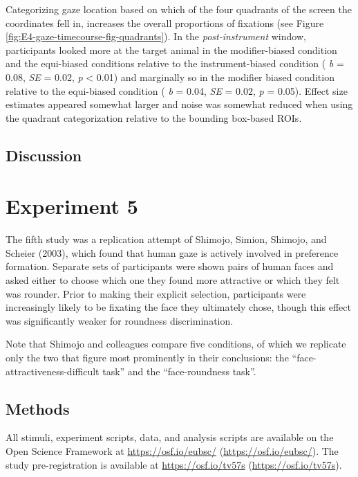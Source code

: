 \documentclass[
  man,floatsintext]{apa6}
\begin{document}
Categorizing gaze location based on which of the four quadrants of the screen the coordinates fell in, increases the overall proportions of fixations (see Figure \ref{fig:E4-gaze-timecourse-fig-quadrants}). In the \emph{post-instrument} window, participants looked more at the target animal in the modifier-biased condition and the equi-biased conditions relative to the instrument-biased condition ( \emph{b} = 0.08, \emph{SE} = 0.02, \emph{p} \textless{} 0.01) and marginally so in the modifier biased condition relative to the equi-biased condition ( \emph{b} = 0.04, \emph{SE} = 0.02, \emph{p} = 0.05). Effect size estimates appeared somewhat larger and noise was somewhat reduced when using the quadrant categorization relative to the bounding box-based ROIs.

\hypertarget{discussion-3}{%
\subsection{Discussion}\label{discussion-3}}

\hypertarget{experiment-5}{%
\section{Experiment 5}\label{experiment-5}}

The fifth study was a replication attempt of Shimojo, Simion, Shimojo, and Scheier (2003),
which found that human gaze is actively involved in preference
formation. Separate sets of participants were shown pairs of human faces
and asked either to choose which one they found more attractive or which
they felt was rounder. Prior to making their explicit selection,
participants were increasingly likely to be fixating the face they
ultimately chose, though this effect was significantly weaker for
roundness discrimination.

Note that Shimojo and colleagues compare five conditions, of which we
replicate only the two that figure most prominently in their
conclusions: the ``face-attractiveness-difficult task'' and the
``face-roundness task''.

\hypertarget{methods-4}{%
\subsection{Methods}\label{methods-4}}

All stimuli, experiment scripts, data, and analysis scripts are
available on the Open Science Framework at \url{https://osf.io/eubsc/}
(\url{https://osf.io/eubsc/}). The study pre-registration is available at
\url{https://osf.io/tv57s} (\url{https://osf.io/tv57s}).
\end{document}
